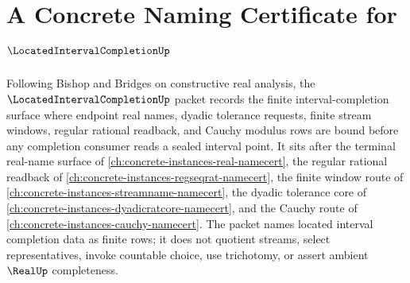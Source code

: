 \chapter{A Concrete Naming Certificate for $\LocatedIntervalCompletionUp$}
\label{ch:concrete-instances-located-interval-completion-namecert}

Following Bishop and Bridges on constructive real analysis, the $\LocatedIntervalCompletionUp$ packet records the finite interval-completion surface where endpoint real names, dyadic tolerance requests, finite stream windows, regular rational readback, and Cauchy modulus rows are bound before any completion consumer reads a sealed interval point. It sits after the terminal real-name surface of \autoref{ch:concrete-instances-real-namecert}, the regular rational readback of \autoref{ch:concrete-instances-regseqrat-namecert}, the finite window route of \autoref{ch:concrete-instances-streamname-namecert}, the dyadic tolerance core of \autoref{ch:concrete-instances-dyadicratcore-namecert}, and the Cauchy route of \autoref{ch:concrete-instances-cauchy-namecert}. The packet names located interval completion data as finite rows; it does not quotient streams, select representatives, invoke countable choice, use trichotomy, or assert ambient $\RealUp$ completeness.

